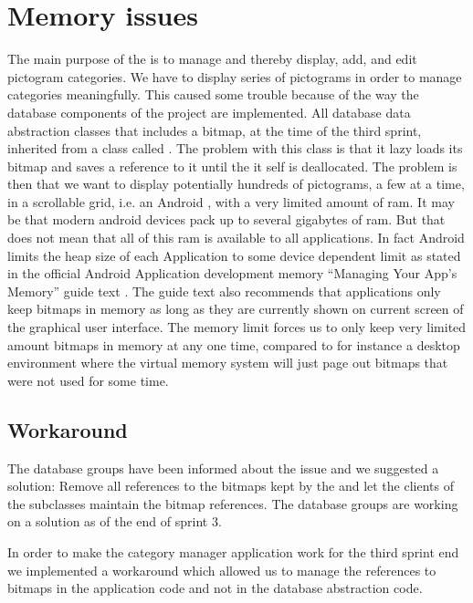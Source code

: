 
\section{Memory issues}
\label{sec:memory_issues}

The main purpose of the \ct is to manage and thereby display, add, and edit pictogram categories. We have to display series of pictograms in order to manage categories meaningfully. This caused some trouble because of the way the database components of the project are implemented. All database data abstraction classes that includes a bitmap, at the time of the third sprint, inherited from a class called . The problem with this class is that it lazy loads its bitmap and saves a reference to it until the  it self is deallocated. The problem is then that we want to display potentially hundreds of pictograms, a few at a time, in a scrollable grid, i.e. an Android , with a very limited amount of ram. It may be that modern android devices pack up to several gigabytes of ram. But that does not mean that all of this ram is available to all applications. In fact Android limits the heap size of each Application to some device dependent limit as stated in the official Android Application development memory ``Managing Your App's Memory'' guide text \parencite{android_memory}. The guide text also recommends that applications only keep bitmaps in memory as long as they are currently shown on current screen of the graphical user interface. The memory limit forces us to only keep very limited amount bitmaps in memory at any one time, compared to for instance a desktop environment where the virtual memory system will just page out bitmaps that were not used for some time. 

\subsection{Workaround}

The database groups have been informed about the issue and we suggested a solution: Remove all references to the bitmaps kept by the  and let the clients of the  subclasses maintain the bitmap references. The database groups are working on a solution as of the end of sprint 3. 

In order to make the category manager application work for the third sprint end we implemented a workaround which allowed us to manage the references to bitmaps in the application code and not in the database abstraction code.

